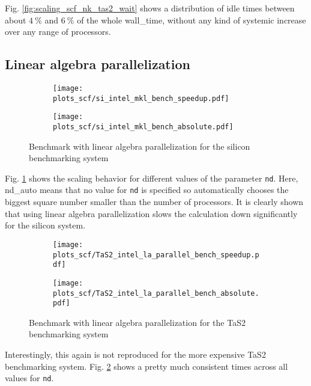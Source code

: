 \documentclass[main.tex]{subfiles}
\begin{document}
Fig. \ref{fig:scaling_scf_nk_tas2_wait} shows a distribution of idle times between about \(\SI{4}{\percent}\) and \(\SI{6}{\percent}\) of the whole \gls{wall_time}, without any kind of systemic increase over any range of processors.

\subsection{Linear algebra parallelization}

\begin{figure}[ht!]
\begin{subfigure}[b]{0.49\textwidth}
    \centering
    \texttt{[image: plots\_scf/si\_intel\_mkl\_bench\_speedup.pdf]}
\end{subfigure}
\begin{subfigure}[b]{0.49\textwidth}
    \centering
    \texttt{[image: plots\_scf/si\_intel\_mkl\_bench\_absolute.pdf]}
\end{subfigure}
\label{fig:scaling_scf_nd_si}
\caption{Benchmark with linear algebra parallelization for the silicon benchmarking system}
\end{figure}

Fig. \ref{fig:scaling_scf_nd_si} shows the scaling behavior for different values of the parameter \texttt{nd}.
Here, nd\_auto means that no value for \texttt{nd} is specified so \QE automatically chooses the biggest square number smaller than the number of processors.
It is clearly shown that using linear algebra parallelization slows the calculation down significantly for the silicon system.

\begin{figure}[ht!]
\begin{subfigure}[b]{0.49\textwidth}
    \centering
    \texttt{[image: plots\_scf/TaS2\_intel\_la\_parallel\_bench\_speedup.pdf]}
\end{subfigure}
\begin{subfigure}[b]{0.49\textwidth}
    \centering
    \texttt{[image: plots\_scf/TaS2\_intel\_la\_parallel\_bench\_absolute.pdf]}
\end{subfigure}
\label{fig:scaling_scf_nd_tas2}
\caption{Benchmark with linear algebra parallelization for the TaS2 benchmarking system}
\end{figure}

Interestingly, this again is not reproduced for the more expensive TaS2 benchmarking system.
Fig. \ref{fig:scaling_scf_nd_tas2} shows a pretty much consistent times across all values for \texttt{nd}.
\end{document}
